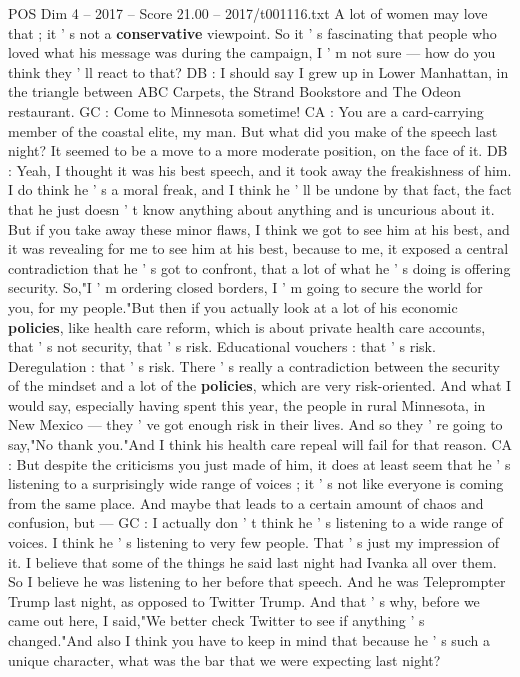 \begin{textsample}{POS Dim 4 – 2017 – Score 21.00 – 2017/t001116.txt}
A lot of women may love that ; it ' s not a \textbf{conservative} viewpoint.
So it ' s fascinating that people who loved what his message was during the campaign, I ' m not sure — how do you think they ' ll react to that?
DB : I should say I grew up in Lower Manhattan, in the triangle between ABC Carpets, the Strand Bookstore and The Odeon restaurant.
GC : Come to Minnesota sometime!
CA : You are a card-carrying member of the coastal elite, my man.
But what did you make of the speech last night?
It seemed to be a move to a more moderate position, on the face of it.
DB : Yeah, I thought it was his best speech, and it took away the freakishness of him.
I do think he ' s a moral freak, and I think he ' ll be undone by that fact, the fact that he just doesn ' t know anything about anything and is uncurious about it.
But if you take away these minor flaws, I think we got to see him at his best, and it was revealing for me to see him at his best, because to me, it exposed a central contradiction that he ' s got to confront, that a lot of what he ' s doing is offering security.
So,"I ' m ordering closed borders, I ' m going to secure the world for you, for my people."But then if you actually look at a lot of his economic \textbf{policies}, like health care reform, which is about private health care accounts, that ' s not security, that ' s risk.
Educational vouchers : that ' s risk.
Deregulation : that ' s risk.
There ' s really a contradiction between the security of the mindset and a lot of the \textbf{policies}, which are very risk-oriented.
And what I would say, especially having spent this year, the people in rural Minnesota, in New Mexico — they ' ve got enough risk in their lives.
And so they ' re going to say,"No thank you."And I think his health care repeal will fail for that reason.
CA : But despite the criticisms you just made of him, it does at least seem that he ' s listening to a surprisingly wide range of voices ; it ' s not like everyone is coming from the same place.
And maybe that leads to a certain amount of chaos and confusion, but — GC : I actually don ' t think he ' s listening to a wide range of voices.
I think he ' s listening to very few people.
That ' s just my impression of it.
I believe that some of the things he said last night had Ivanka all over them.
So I believe he was listening to her before that speech.
And he was Teleprompter Trump last night, as opposed to Twitter Trump.
And that ' s why, before we came out here, I said,"We better check Twitter to see if anything ' s changed."And also I think you have to keep in mind that because he ' s such a unique character, what was the bar that we were expecting last night?

\end{textsample}
